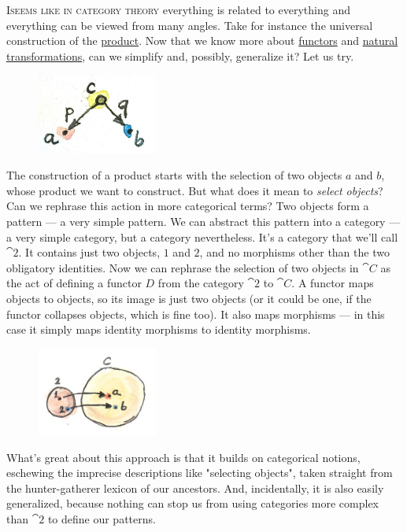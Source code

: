 \lettrine[lhang=0.17]{I}{seems like in category theory} everything is related to everything and
everything can be viewed from many angles. Take for instance the
universal construction of the \hyperref[products-and-coproducts]{product}.
Now that we know more about \hyperref[chap-functors]{functors} and
\hyperref[natural-transformations]{natural transformations}, can we simplify and, possibly, generalize it? Let us
try.

\begin{figure}[H]
\centering
\includegraphics[width=1.56250in]{images/productpattern.jpg}
\end{figure}

\noindent
The construction of a product starts with the selection of two objects
$a$ and $b$, whose product we want to construct. But what
does it mean to \emph{select objects}? Can we rephrase this action in
more categorical terms? Two objects form a pattern --- a very simple
pattern. We can abstract this pattern into a category --- a very simple
category, but a category nevertheless. It's a category that we'll call
$\cat{2}$. It contains just two objects, $1$ and $2$, and no morphisms
other than the two obligatory identities. Now we can rephrase the
selection of two objects in $\cat{C}$ as the act of defining a functor $D$
from the category $\cat{2}$ to $\cat{C}$. A functor maps objects to
objects, so its image is just two objects (or it could be one, if the
functor collapses objects, which is fine too). It also maps morphisms
--- in this case it simply maps identity morphisms to identity
morphisms.

\begin{figure}[H]
\centering
\includegraphics[width=1.56250in]{images/two.jpg}
\end{figure}

\noindent
What's great about this approach is that it builds on categorical
notions, eschewing the imprecise descriptions like "selecting
objects", taken straight from the hunter-gatherer lexicon of our
ancestors. And, incidentally, it is also easily generalized, because
nothing can stop us from using categories more complex than $\cat{2}$
to define our patterns.

